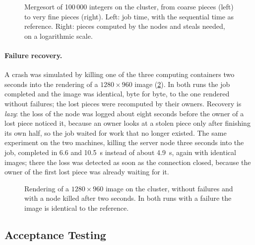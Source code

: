 \documentclass{scrartcl}
\begin{document}
\begin{figure}
  \centering
  
  \caption{Mergesort of 100\,000 integers on the cluster, from coarse pieces (left) to very fine pieces (right). Left: job time, with the sequential time as reference. Right: pieces computed by the nodes and steals needed, on a logarithmic scale.}
  \label{fig:granularity}
\end{figure}

\paragraph{Failure recovery.}
A crash was simulated by killing one of the three computing containers two seconds into the rendering of a $1280\times960$ image (\cref{fig:recovery}).
%
In both runs the job completed and the image was identical, byte for byte, to the one rendered without failures; the lost pieces were recomputed by their owners.
%
Recovery is \emph{lazy}: the loss of the node was logged about eight seconds before the owner of a lost piece noticed it, because an owner looks at a stolen piece only after finishing its own half, so the job waited for work that no longer existed.
%
The same experiment on the two machines, killing the server node three seconds into the job, completed in 6.6 and 10.5~s instead of about 4.9~s, again with identical images; there the loss was detected as soon as the connection closed, because the owner of the first lost piece was already waiting for it.

\begin{figure}
  \centering
  
  \caption{Rendering of a $1280\times960$ image on the cluster, without failures and with a node killed after two seconds. In both runs with a failure the image is identical to the reference.}
  \label{fig:recovery}
\end{figure}

\subsection{Acceptance Testing}\label{acceptance-test}\label{sec:acceptance}
\end{document}
